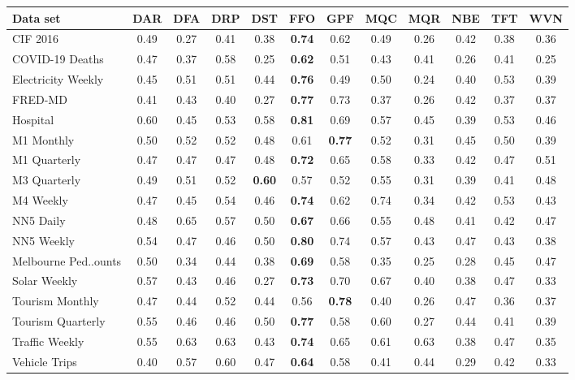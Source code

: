 
    \begin{tabular}{l|ccccccccccc}
        \toprule 
        Data set & DAR & DFA & DRP & DST & FFO & GPF & MQC & MQR & NBE & TFT & WVN \\
        \midrule
        CIF 2016 & 0.49 & 0.27 & 0.41 & 0.38 & \textbf{0.74} & 0.62 & 0.49 & 0.26 & 0.42 & 0.38 & 0.36 \\
        COVID-19 Deaths & 0.47 & 0.37 & 0.58 & 0.25 & \textbf{0.62} & 0.51 & 0.43 & 0.41 & 0.26 & 0.41 & 0.25 \\
        Electricity Weekly & 0.45 & 0.51 & 0.51 & 0.44 & \textbf{0.76} & 0.49 & 0.50 & 0.24 & 0.40 & 0.53 & 0.39 \\
        FRED-MD & 0.41 & 0.43 & 0.40 & 0.27 & \textbf{0.77} & 0.73 & 0.37 & 0.26 & 0.42 & 0.37 & 0.37 \\
        Hospital & 0.60 & 0.45 & 0.53 & 0.58 & \textbf{0.81} & 0.69 & 0.57 & 0.45 & 0.39 & 0.53 & 0.46 \\
        M1 Monthly & 0.50 & 0.52 & 0.52 & 0.48 & 0.61 & \textbf{0.77} & 0.52 & 0.31 & 0.45 & 0.50 & 0.39 \\
        M1 Quarterly & 0.47 & 0.47 & 0.47 & 0.48 & \textbf{0.72} & 0.65 & 0.58 & 0.33 & 0.42 & 0.47 & 0.51 \\
        M3 Quarterly & 0.49 & 0.51 & 0.52 & \textbf{0.60} & 0.57 & 0.52 & 0.55 & 0.31 & 0.39 & 0.41 & 0.48 \\
        M4 Weekly & 0.47 & 0.45 & 0.54 & 0.46 & \textbf{0.74} & 0.62 & 0.74 & 0.34 & 0.42 & 0.53 & 0.43 \\
        NN5 Daily & 0.48 & 0.65 & 0.57 & 0.50 & \textbf{0.67} & 0.66 & 0.55 & 0.48 & 0.41 & 0.42 & 0.47 \\
        NN5 Weekly & 0.54 & 0.47 & 0.46 & 0.50 & \textbf{0.80} & 0.74 & 0.57 & 0.43 & 0.47 & 0.43 & 0.38 \\
        Melbourne Ped..ounts & 0.50 & 0.34 & 0.44 & 0.38 & \textbf{0.69} & 0.58 & 0.35 & 0.25 & 0.28 & 0.45 & 0.47 \\
        Solar Weekly & 0.57 & 0.43 & 0.46 & 0.27 & \textbf{0.73} & 0.70 & 0.67 & 0.40 & 0.38 & 0.47 & 0.33 \\
        Tourism Monthly & 0.47 & 0.44 & 0.52 & 0.44 & 0.56 & \textbf{0.78} & 0.40 & 0.26 & 0.47 & 0.36 & 0.37 \\
        Tourism Quarterly & 0.55 & 0.46 & 0.46 & 0.50 & \textbf{0.77} & 0.58 & 0.60 & 0.27 & 0.44 & 0.41 & 0.39 \\
        Traffic Weekly & 0.55 & 0.63 & 0.63 & 0.43 & \textbf{0.74} & 0.65 & 0.61 & 0.63 & 0.38 & 0.47 & 0.35 \\
        Vehicle Trips & 0.40 & 0.57 & 0.60 & 0.47 & \textbf{0.64} & 0.58 & 0.41 & 0.44 & 0.29 & 0.42 & 0.33 \\
        \bottomrule
    \end{tabular}